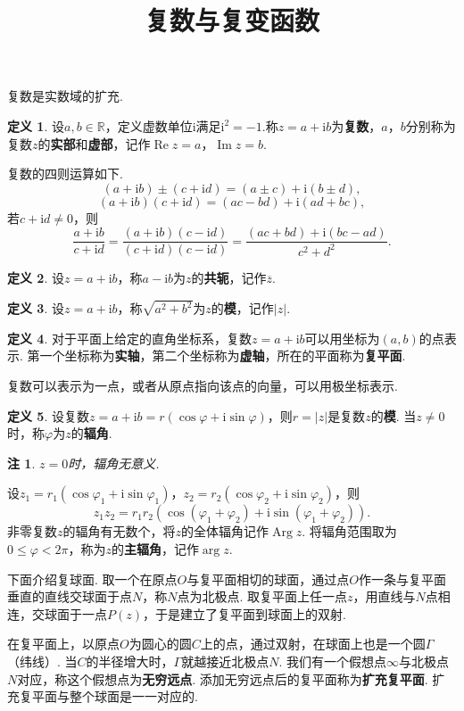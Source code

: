 \documentclass[12pt]{ctexart}
\title{\vspace{-2em}\textbf{复数与复变函数}\vspace{-2em}}
\date{ }
\theoremstyle{definition}
\newtheorem{definition}{定义}
\theoremstyle{plain}
\newtheorem*{remark}{注}
\newcommand{\iu}{\mathrm{i}}
\newcommand{\Arg}{\operatorname{Arg}}
\renewcommand{\Re}{\operatorname{Re}}
\renewcommand{\Im}{\operatorname{Im}}
\begin{document}
	\maketitle
	复数是实数域的扩充.
	\begin{definition}
		设$a,b\in\mathbb{R}$，定义虚数单位$\iu$满足$\iu^2=-1$.称$z=a+\iu b$为\textbf{复数}，$a$，$b$分别称为复数$z$的\textbf{实部}和\textbf{虚部}，记作$\Re z=a$，$\Im z=b$.
	\end{definition}
	复数的四则运算如下.
	$$(a+\iu b)\pm(c+\iu d)=(a\pm c)+\iu(b\pm d),$$
	$$(a+\iu b)(c+\iu d)=(ac-bd)+\iu(ad+bc),$$
	若$c+\iu d\neq 0$，则
	$$\frac{a+\iu b}{c+\iu d}=\frac{(a+\iu b)(c-\iu d)}{(c+\iu d)(c-\iu d)}=\frac{(ac+bd)+\iu (bc-ad)}{c^2+d^2}.$$
	\begin{definition}
		设$z=a+\iu b$，称$a-\iu b$为$z$的\textbf{共轭}，记作$\overline{z}$.
	\end{definition}
	\begin{definition}
		设$z=a+\iu b$，称$\sqrt{a^2+b^2}$为$z$的\textbf{模}，记作$|z|$.
	\end{definition}
	\begin{definition}
		对于平面上给定的直角坐标系，复数$z=a+\iu b$可以用坐标为$(a,b)$的点表示. 第一个坐标称为\textbf{实轴}，第二个坐标称为\textbf{虚轴}，所在的平面称为\textbf{复平面}.
	\end{definition}
	复数可以表示为一点，或者从原点指向该点的向量，可以用极坐标表示.
	\begin{definition}
		设复数$z=a+\iu b=r\left(\cos\varphi+\iu\sin\varphi\right)$，则$r=|z|$是复数$z$的\textbf{模}. 当$z\neq 0$时，称$\varphi$为$z$的\textbf{辐角}.
	\end{definition}
	\begin{remark}
		$z=0$时，辐角无意义.
	\end{remark}
	设$z_1=r_1\left(\cos\varphi_1+\iu\sin\varphi_1\right)$，$z_2=r_2\left(\cos\varphi_2+\iu\sin\varphi_2\right)$，则
	$$z_1z_2=r_1r_2\left(\cos(\varphi_1+\varphi_2)+\iu\sin(\varphi_1+\varphi_2)\right).$$
	非零复数$z$的辐角有无数个，将$z$的全体辐角记作$\Arg z$. 将辐角范围取为$0\leqslant\varphi<2\pi$，称为$z$的\textbf{主辐角}，记作$\arg z$.
	
	下面介绍复球面. 取一个在原点$O$与复平面相切的球面，通过点$O$作一条与复平面垂直的直线交球面于点$N$，称$N$点为北极点. 取复平面上任一点$z$，用直线与$N$点相连，交球面于一点$P(z)$，于是建立了复平面到球面上的双射. 
	
	在复平面上，以原点$O$为圆心的圆$C$上的点，通过双射，在球面上也是一个圆$\varGamma$（纬线）. 当$C$的半径增大时，$\varGamma$就越接近北极点$N$. 我们有一个假想点$\infty$与北极点$N$对应，称这个假想点为\textbf{无穷远点}. 添加无穷远点后的复平面称为\textbf{扩充复平面}. 扩充复平面与整个球面是一一对应的.
	
\end{document}
